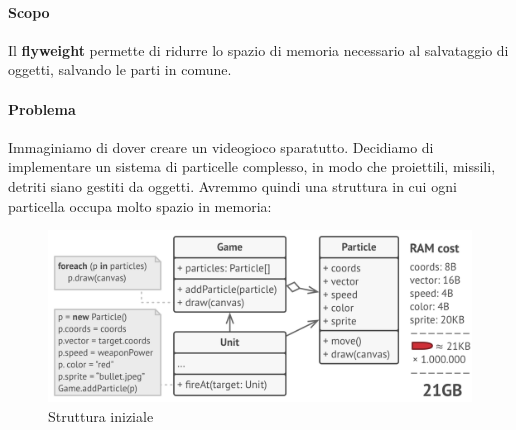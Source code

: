 \documentclass[11pt]{article}
\begin{document}
\paragraph{Scopo}
Il \textbf{flyweight} permette di ridurre lo spazio di memoria necessario al salvataggio di oggetti, salvando le parti in comune.  
\paragraph{Problema}
Immaginiamo di dover creare un videogioco sparatutto. Decidiamo di implementare un sistema di particelle complesso, in modo che proiettili, missili, detriti siano gestiti da oggetti. Avremmo quindi una struttura in cui ogni particella occupa molto spazio in memoria:
\begin{figure}[H]
    \includegraphics[width=\linewidth]{res/teoria/FlyweightProblem.png}
    \caption{Struttura iniziale}
\end{figure}
\end{document}

